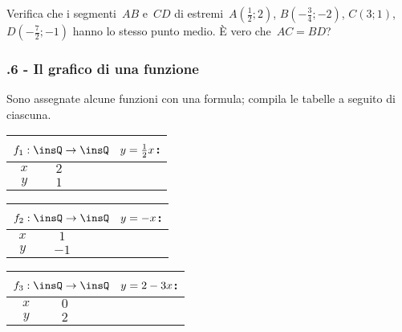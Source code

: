 \begin{esercizio}
\label{ese:D.36}
Verifica che i segmenti~${AB}$ e~${CD}$ di estremi~$A\left(\frac{1}{2};2\right)$, $B\left(-{\frac{3}{4}};-2\right)$, $C(3;1)$,
$D\left(-{\frac{7}{2}};-1\right)$ hanno lo stesso punto medio. È vero che~${AC}={BD}$?
\end{esercizio}

\subsubsection*{\thechapter.6 - Il grafico di una funzione}

\begin{esercizio}
\label{ese:D.37}
Sono assegnate alcune funzioni con una formula; compila le tabelle a seguito di ciascuna.
\begin{multicols}{3}
 \begin{center}
 \begin{tabular}{cccccc}
 \multicolumn{6}{c}{$f_1:\insQ \rightarrow \insQ\quad y=\frac{1}{2}x$:}\\
 \toprule
  $x$ & $2$& & & &\\
  $y$ & $1$& & & & \\
\bottomrule
 \end{tabular}
 \end{center}

\begin{center}
 \begin{tabular}{cccccc}
 \multicolumn{6}{c}{ $f_2:\insQ \rightarrow \insQ\quad y=-x$:}\\
\toprule
$x$ & $1$& & & &\\
$y$ & $-1$& & & & \\
\bottomrule
 \end{tabular}
\end{center}

 \begin{center}
 \begin{tabular}{cccccc}
 \multicolumn{6}{c}{ $f_3:\insQ \rightarrow \insQ\quad y=2-3x$:}\\
\toprule
$x$ & $0$& & & &\\
$y$ & $2$& & & & \\
\bottomrule
 \end{tabular}
 \end{center}
\end{multicols}
\end{esercizio}

\pagebreak

